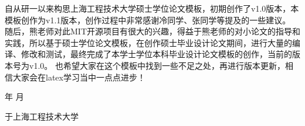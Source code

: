 \newpage
{}
\begin{center}
    \heiti\bfseries\xiaoer{}
\end{center}

自从研一以来构思上海工程技术大学硕士学位论文模板，初期创作了v1.0版本，本模板创作为v1.1版本，创作过程中非常感谢冷同学、张同学等提及的一些建议。
随后，熊老师对此MIT开源项目有很大的兴趣，得益于熊老师的对小论文的指导和实践，所以基于硕士学位论文模板，在创作硕士毕业设计论文期间，进行大量的编译、修改和测试，最终完成了本学士学位本科毕业设计论文模板的创作，当前的版本号为v1.0。
也希望大家在这个模板中找到一些不足之处，再进行版本更新，相信大家会在latex学习当中一点点进步！

\vspace{0.56\textheight}

\begin{flushright}
    \number\year    年 \number\month  月
    
    于上海工程技术大学
\end{flushright}